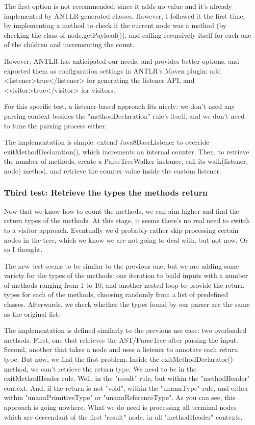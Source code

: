 \documentclass[11pt]{article}
\begin{document}
The first option is not recommended, since it adds no value and it's already implemented by ANTLR-generated
classes. However, I followed it the first time, by implementing a method to check if the current
node was a method (by checking the class of node.getPayload()), and calling recursively itself for each
one of the children and incrementing the count.

However, ANTLR has anticipated our needs, and provides better options, and exported them as configuration
settings in ANTLR's Maven plugin: add <listener>true</listener> for generating the listener API, and <visitor>true</visitor> for visitors.

For this specific test, a listener-based approach fits nicely: we don't need any parsing context besides the
"methodDeclaration" rule's itself, and we don't need to tune the parsing process either.

The implementation is simple: extend Java8BaseListener to override exitMethodDeclaration(), which increments an
internal counter. Then, to retrieve the number of methods, create a ParseTreeWalker instance, call its walk(listener, node) method,
and retrieve the counter value inside the custom listener.

\subsubsection{Third test: Retrieve the types the methods return}
\label{sec-1-3-3}

Now that we know how to count the methods, we can aim higher and find the return types of the methods.
At this stage, it seems there's no real need to switch to a visitor approach. Eventually we'd probably rather skip processing
certain nodes in the tree, which we know we are not going to deal with, but not now. Or so I thought.

The new test seems to be similar to the previous one, but we are adding some variety for the types of the methods: one iteration
to build inputs with a number of methods ranging from 1 to 10, and another nested loop to provide the return types for
each of the methods, choosing randomly from a list of predefined classes. Afterwards, we check whether the types found
by our parser are the same as the original list.

The implementation is defined similarly to the previous use case: two overloaded methods. First, one that retrieves the
AST/ParseTree after parsing the input. Second, another that takes a node and uses a listener to annotate each return type.
But now, we find the first problem. Inside the exitMethodDeclarator() method, we can't retrieve the return type. We need to be
in the exitMethodHeader rule. Well, in the "result" rule, but within the "methodHeader" context. And, if the return is not "void",
within the "unannType" rule, and either within "unannPrimitiveType" or "unannReferenceType". As you can see, this approach is
going nowhere. What we do need is processing all terminal nodes which are descendant of the first "result" node, in all "methodHeader"
contexts.
\end{document}
